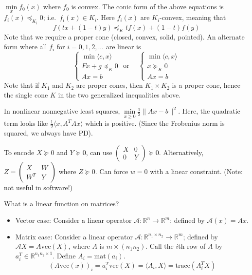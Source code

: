 \documentclass[english, 11pt]{article}
\begin{document}
\begin{enumerate}
$\min \limits_x f_0(x)$ where $f_0$ is convex. The conic form of the above equations is $f_i(x) \preceq_{K_i} 0$; i.e.\ $f_i(x) \in K_i$. Here $f_i(x)$ are $K_i$-convex, meaning that
\[
f(tx + (1-t) y) \preceq_K t f(x) + (1-t) f(y)
\]
Note that we require a proper cone (closed, convex, solid, pointed). An alternate form where all $f_i$ for $i=0,1,2,\dots$ are linear is
\[
\begin{cases} \min \langle c, x \rangle \\
Fx + g \preceq_K 0\\
Ax=b
\end{cases}
\text{ or } \quad 
\begin{cases} \min \langle c, x \rangle \\
x \succeq_K  0 \\
Ax=b
\end{cases}
\]
Note that if $K_1$ and $K_2$ are proper cones, then $K_1 \times K_2$ is a proper cone, hence the single cone $K$ in the two generalized inequalities above. 
\end{enumerate}





\begin{rem}
In nonlinear nonnegative least squares, $\min \limits_{x \ge 0} \frac{1}{2} \|Ax-b \|^2$. Here, the quadratic term looks like $\frac{1}{2} \langle x, A^T A x \rangle$ which is positive. (Since the Frobenius norm is squared, we always have PD).
\end{rem}

\begin{rem}
To encode $X \succeq 0$ and $Y \succeq 0$, can use $\begin{pmatrix} X &0 \\ 0 &Y\end{pmatrix} \succeq 0$. Alternatively, $Z = \begin{pmatrix} X & W \\ W^T & Y \end{pmatrix}$ where $Z \succeq 0$. Can force $w=0$ with a linear constraint. (Note: not useful in software!)
\end{rem}

\begin{rem}
What is a linear function on matrices? 

\begin{itemize}
\item Vector case: Consider a linear operator $\mathcal{A}:\mathbb{R}^n \to \mathbb{R}^m$; defined by $\mathcal{A}(x) = Ax$.

\item Matrix case: Consider a linear operator $\mathcal{A}:\mathbb{R}^{n_1 \times n_2} \to \mathbb{R}^m$; defined by $\mathcal{A}X = A \text{vec}(X)$, where $A$ is $m \times (n_1n_2)$. Call the $i$th row of $A$ by $a_i^T \in \mathbb{R}^{n_1 n_2 \times 1}$. Define $A_i = \text{mat}(a_i)$.
\[
(A \text{vec}(x))_i = a_i^T \text{vec}(X) = \langle A_i, X \rangle = \text{trace}(A_i^T X)
\]
\end{itemize}
\end{rem}
\end{document}
